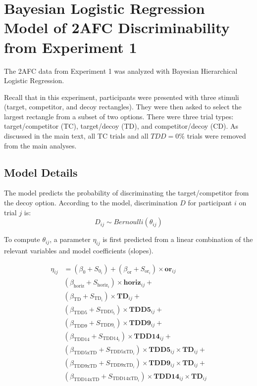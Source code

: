 \chapter{Bayesian Logistic Regression Model of 2AFC Discriminability from Experiment 1}
The 2AFC data from Experiment 1 was analyzed with Bayesian Hierarchical Logistic Regression. 

Recall that in this experiment, participants were presented with three stimuli (target, competitor, and decoy rectangles). They were then asked to select the largest rectangle from a subset of two options. There were three trial types: target/competitor (TC), target/decoy (TD), and competitor/decoy (CD). As discussed in the main text, all TC trials and all $TDD = 0\%$ trials were removed from the main analyses.

\section{Model Details} 

The model predicts the probability of discriminating the target/competitor from the decoy option. According to the model, discrimination $D$ for participant $i$ on trial $j$ is:
\begin{equation}
    D_{ij} \sim Bernoulli(\theta_{ij})
\end{equation}

To compute $\theta_{ij}$, a parameter $\eta_{ij}$ is first predicted from a linear combination of the relevant variables and model coefficients (slopes).

\begin{equation}
\begin{aligned}
    \eta_{ij} &= (\beta_{0} + S_{0_{i}}) + (\beta_{\mathrm{or}} + S_{\mathrm{or}_{i}}) \times \bm{or}_{ij}\\
    & (\beta_{\mathrm{horiz}} + S_{\mathrm{horiz}_{i}}) \times \bm{horiz}_{ij} +\\
    & (\beta_{\mathrm{TD}} + S_{\mathrm{TD}_{i}}) \times \bm{TD}_{ij} +\\
    & (\beta_{\mathrm{TDD5}} + S_{\mathrm{TDD5}_{i}}) \times \bm{TDD5}_{ij} +\\
    & (\beta_{\mathrm{TDD9}} + S_{\mathrm{TDD9}_{i}}) \times \bm{TDD9}_{ij} +\\
    & (\beta_{\mathrm{TDD14}} + S_{\mathrm{TDD14}_{i}}) \times \bm{TDD14}_{ij} +\\
    & (\beta_{\mathrm{TDD5xTD}} + S_{\mathrm{TDD5xTD}_{i}}) \times \bm{TDD5}_{ij} \times \bm{TD}_{ij} +\\
    & (\beta_{\mathrm{TDD9xTD}} + S_{\mathrm{TDD9xTD}_{i}}) \times \bm{TDD9}_{ij} \times \bm{TD}_{ij} +\\
    & (\beta_{\mathrm{TDD14xTD}} + S_{\mathrm{TDD14xTD}_{i}}) \times \bm{TDD14}_{ij} \times \bm{TD}_{ij}
\end{aligned}
\label{eqn:logit1}
\end{equation}

